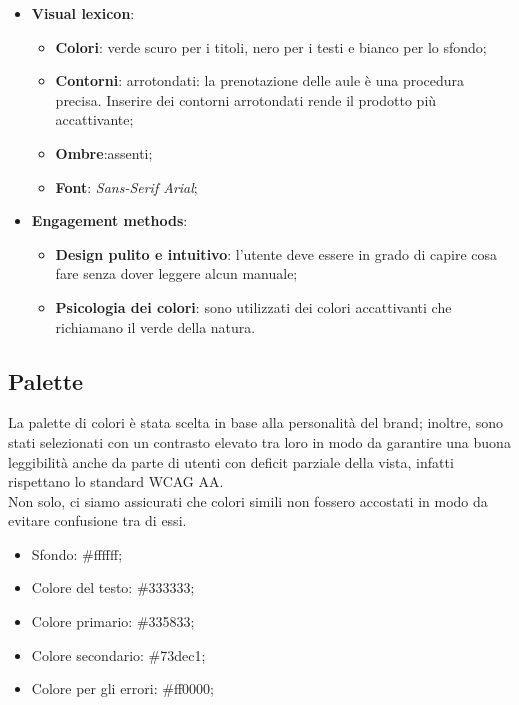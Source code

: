 \begin{itemize}
\begin{center}
\begin{tikzpicture}
		      \end{tikzpicture}
	      \end{center}

	\item \textbf{Visual lexicon}:
	      \begin{itemize}
		      \item \textbf{Colori}: verde scuro per i titoli, nero per i testi
		            e bianco per lo sfondo;
		      \item \textbf{Contorni}: arrotondati: la prenotazione delle
		            aule è una procedura precisa. Inserire dei contorni
		            arrotondati rende il prodotto più accattivante;
		      \item \textbf{Ombre}:assenti;

		      \item \textbf{Font}: \textit{Sans-Serif Arial};
	      \end{itemize}

	\item \textbf{Engagement methods}:
	      \begin{itemize}
		      \item \textbf{Design pulito e intuitivo}: l'utente deve essere in
		            grado di capire cosa fare senza dover leggere alcun manuale;

		      \item \textbf{Psicologia dei colori}: sono utilizzati dei colori
		            accattivanti che richiamano il verde della natura.
	      \end{itemize}
\end{itemize}

\subsection{Palette}

La palette di colori è stata scelta in base alla personalità del brand;
inoltre, sono stati selezionati con un contrasto elevato tra loro in
modo da garantire una buona leggibilità anche da parte di utenti con deficit
parziale della vista, infatti rispettano lo standard WCAG AA.\\
Non solo, ci siamo assicurati che colori simili non fossero accostati in modo
da evitare confusione tra di essi.

\begin{itemize}
	\item Sfondo: \#ffffff;
	\item Colore del testo: \#333333;
	\item Colore primario: \#335833;
	\item Colore secondario: \#73dec1;
	\item Colore per gli errori: \#ff0000;
\end{itemize}

